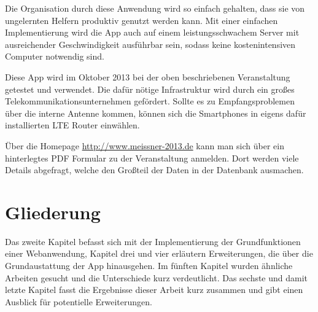 Die Organisation durch diese Anwendung wird so einfach gehalten, dass sie von ungelernten Helfern produktiv genutzt werden kann. Mit einer einfachen Implementierung wird die App auch auf einem leistungsschwachem Server mit ausreichender Geschwindigkeit ausführbar sein, sodass keine kostenintensiven Computer notwendig sind.\par

Diese App wird im Oktober 2013 bei der oben beschriebenen Veranstaltung getestet und verwendet. Die dafür nötige Infrastruktur wird durch ein großes Telekommunikationsunternehmen gefördert. Sollte es zu Empfangsproblemen über die interne Antenne kommen, können sich die Smartphones in eigens dafür installierten LTE Router einwählen.\par

Über die Homepage \url{http://www.meissner-2013.de} kann man sich über ein hinterlegtes PDF Formular zu der Veranstaltung anmelden. Dort werden viele Details abgefragt, welche den Großteil der Daten in der Datenbank ausmachen.

\section{Gliederung}
Das zweite Kapitel befasst sich mit der Implementierung der Grundfunktionen einer Webanwendung, Kapitel drei und vier erläutern Erweiterungen, die über die Grundaustattung der App hinausgehen. Im fünften Kapitel wurden ähnliche Arbeiten gesucht und die Unterschiede kurz verdeutlicht. Das sechste und damit letzte Kapitel fasst die Ergebnisse dieser Arbeit kurz zusammen und gibt einen Ausblick für potentielle Erweiterungen. 